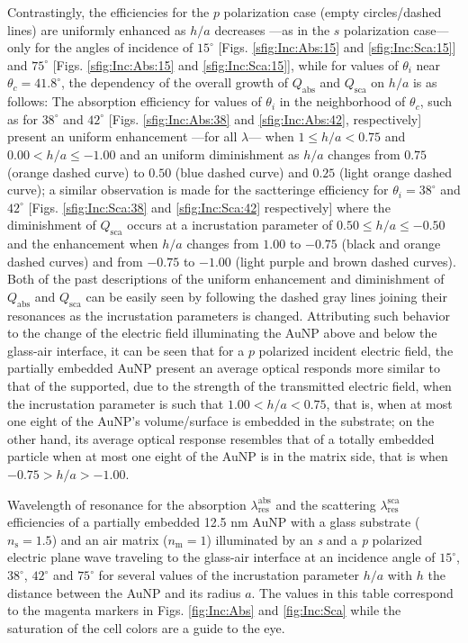Contrastingly, the efficiencies for the $p$ polarization case (empty circles/dashed lines) are uniformly enhanced as $h/a$ decreases ---as in the $s$ polarization case--- only for the angles of incidence of $15^\circ$ [Figs. \ref{sfig:Inc:Abs:15} and \ref{sfig:Inc:Sca:15}] and $75^\circ$ [Figs. \ref{sfig:Inc:Abs:15} and \ref{sfig:Inc:Sca:15}], while for values of $\theta_i$ near $\theta_c = 41.8^\circ$, the dependency of the overall growth of $Q_\text{abs}$ and $Q_\text{sca}$ on $h/a$ is as follows: The absorption efficiency for values of $\theta_i $ in the neighborhood of $\theta_c$, such as for $38^\circ$ and $42^\circ$ [Figs. \ref{sfig:Inc:Abs:38} and \ref{sfig:Inc:Abs:42}, respectively] present an uniform enhancement ---for all $\lambda$--- when $1 \leq h/a < 0.75$ and $0.00< h/a \leq -1.00$ and an uniform diminishment as $h/a$ changes from $0.75$ (orange dashed curve) to $0.50$  (blue dashed curve)  and $0.25$  (light orange dashed curve); a similar observation is made for the sactteringe efficiency for $\theta_i = 38 ^\circ$ and $42 ^\circ$   [Figs. \ref{sfig:Inc:Sca:38} and \ref{sfig:Inc:Sca:42} respectively] where the diminishment of $Q_\text{sca}$ occurs at a incrustation parameter of $0.50 \leq h/a \leq -0.50$ and the enhancement when $h/a$ changes from $1.00$ to $-0.75$ (black and orange dashed curves) and from $-0.75$ to $-1.00$  (light purple and brown dashed curves). Both of the past descriptions of the uniform enhancement and diminishment of $Q_\text{abs}$ and $Q_\text{sca}$ can be easily seen by following the dashed gray lines joining their resonances as the incrustation parameters is changed. Attributing such behavior to the change of the electric field illuminating the AuNP above and below the glass-air interface, it can be seen that for a $p$ polarized incident electric field, the partially embedded AuNP present an average optical responds more similar to that of the supported, due to the strength of the transmitted electric field,  when the incrustation parameter is such that $1.00<h/a<0.75$, that is, when at most one eight of the AuNP's volume/surface is embedded in the substrate; on the other hand, its average optical response resembles that of a totally embedded particle when at most one eight of the AuNP is in the matrix side, that is when  $-0.75>h/a>-1.00$.

\begin{table}[b!]\footnotesize\centering
    \caption{Wavelength of resonance for the absorption $\lambda_\text{res}^\text{abs}$ and the scattering $\lambda_\text{res}^\text{sca}$ efficiencies of a partially embedded 12.5 nm AuNP with a glass substrate ($n_\text{s} = 1.5$) and an air matrix ($n_\text{m} = 1$)    illuminated by an \textit{s} and a \textit{p} polarized electric plane wave traveling to the glass-air interface at an incidence angle of $15^\circ$,  $38^\circ$,  $42^\circ$ and  $75^\circ$ for several values of the incrustation parameter $h/a$ with $h$ the distance between the AuNP and its radius $a$. The values in this table correspond to the magenta markers in Figs. \ref{fig:Inc:Abs} and \ref{fig:Inc:Sca} while the saturation of the cell colors are a guide to the eye.}
    \label{tab:Resonances}
    
\end{table}


